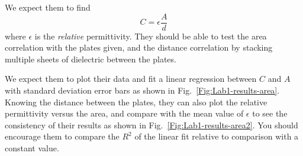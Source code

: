 \documentclass[12pt]{report}
\begin{document}
\begin{tcolorbox}[title=Expected result]
We expect them to find
\begin{equation}
C = \epsilon \frac{A}{d}
\label{Eq:Capacitance-A/d}
\end{equation}
where $\epsilon$ is the \textit{relative} permittivity. They should be able to test the area correlation with the plates given, and the distance correlation  by stacking multiple sheets of dielectric between the plates.
\end{tcolorbox}

\begin{tcolorbox}
We expect them to plot their data and fit a linear regression between $C$ and $A$ with standard deviation error bars as shown in Fig.~\ref{Fig:Lab1-results-area}. Knowing the distance between the plates, they can also plot the relative permittivity versus the area, and compare with the mean value of $\epsilon$ to see the consistency of their results as shown in Fig.~\ref{Fig:Lab1-results-area2}. You should encourage them to compare the $R^2$ of the linear fit relative to comparison with a constant value.
\end{tcolorbox}
\end{document}
